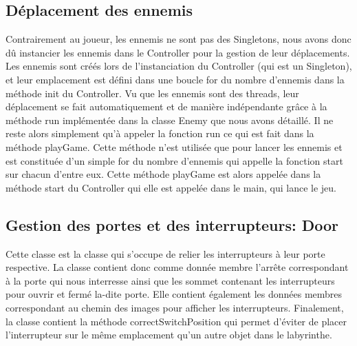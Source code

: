 \documentclass [10pt, a4paper]{article}
\begin{document}
\subsection {Déplacement des ennemis}
Contrairement au joueur, les ennemis ne sont pas des Singletons, nous avons donc dû instancier les ennemis dans le Controller pour la gestion de leur déplacements. Les ennemis sont créés lors de l'instanciation du Controller (qui est un Singleton), et leur emplacement est défini dans une boucle for du nombre d'ennemis dans la méthode init du Controller. Vu que les ennemis sont des threads, leur déplacement se fait automatiquement et de manière indépendante grâce à la méthode run implémentée dans la classe Enemy que nous avons détaillé. Il ne reste alors simplement qu'à appeler la fonction run ce qui est fait dans la méthode playGame. Cette méthode n'est utilisée que pour lancer les ennemis et est constituée d'un simple for du nombre d'ennemis qui appelle la fonction start sur chacun d'entre eux. Cette méthode playGame est alors appelée dans la méthode start du Controller qui elle est appelée dans le main, qui lance le jeu.







\subsection {Gestion des portes et des interrupteurs: Door}
Cette classe est la classe qui s'occupe de relier les interrupteurs à leur porte respective. La classe contient donc comme donnée membre l'arrête correspondant à la porte qui nous interresse ainsi que les sommet contenant les interrupteurs pour ouvrir et fermé la-dite porte. Elle contient également les données membres correspondant au chemin des images pour afficher les interrupteurs. Finalement, la classe contient la méthode correctSwitchPosition qui permet d'éviter de placer l'interrupteur sur le même emplacement qu'un autre objet dans le labyrinthe.
\end{document}

